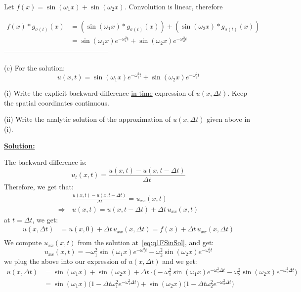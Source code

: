 \documentclass{article}
\begin{document}
Let $f(x) = \sin(\omega_1 x) + \sin(\omega_2x)$.
Convolution is linear, therefore

\begin{align*}
  f(x) \ast g_{\sigma(t)}(x) &= (\sin(\omega_1 x) \ast g_{\sigma(t)}(x) ) + ( \sin(\omega_2 x) \ast g_{\sigma(t)}(x) ) \\
  &= \sin(\omega_1 x)  e^{-\omega_1^2 t}  + \sin(\omega_2 x)  e^{-\omega_2 ^2 t} 
\end{align*}
---------------------------------------------

(c) For the solution:
\begin{equation} \label{eq:q1FSinSol}
  u(x,t) = \sin(\omega_1 x)e^{-\omega_1^2 t} + \sin(\omega_2 x)e^{-\omega_2^2 t}
\end{equation}

(i) Write the explicit backward-difference \ul{in time} expression of \(u(x, \Delta t)\). Keep the spatial coordinates continuous.

(ii) Write the analytic solution of the approximation of \(u(x, \Delta t)\) given above in (i).

\textbf{\ul{Solution:}}

The backward-difference is:
\[
  u_{t}(x,t) = \frac{u(x,t) - u(x,t -\Delta t)}{\Delta t}
\]
Therefore, we get that:
\begin{align*}
  & \frac{u(x,t) - u(x,t -\Delta t)}{\Delta t} = u_{xx}(x, t) \\
  \Rightarrow \ & u(x,t) = u(x,t-\Delta t) + \Delta t \, u_{xx}(x,t)
\end{align*}
at $t= \Delta t$, we get:
\begin{align*}
  u(x,\Delta t) &= u(x,0) + \Delta t \, u_{xx}(x, \Delta t) = f(x) + \Delta t \, u_{xx}(x,\Delta t) \\
\end{align*}
We compute $u_{xx}(x,t)$ from the solution at~\cref{eq:q1FSinSol}, and get:
\[
  u_{xx}(x,t) = -\omega_1 ^2 \sin(\omega_1 x) e^{-\omega_1 ^2 t} - \omega_2 ^2 \sin(\omega_2 x) e^{- \omega_2 ^2 t}  
\]
we plug the above into our expression of $u(x, \Delta t)$ and we get:
\begin{align*}
  u(x, \Delta t) &= \sin(\omega_1x) + \sin(\omega_2x)  + \Delta t \cdot \big( -\omega_1 ^2 \sin(\omega_1 x) e^{-\omega_1 ^2 \Delta t} - \omega_2 ^2 \sin(\omega_2 x) e^{- \omega_2 ^2 \Delta t} \big) \\
  &= \sin(\omega_1 x) \big( 1 - \Delta t \omega_1 ^2 e^{-\omega_1^2 \Delta t}  \big) + \sin(\omega_2 x) \big( 1 - \Delta t \omega_2 ^2 e^{-\omega_2^2 \Delta t}  \big)
\end{align*}
\end{document}
